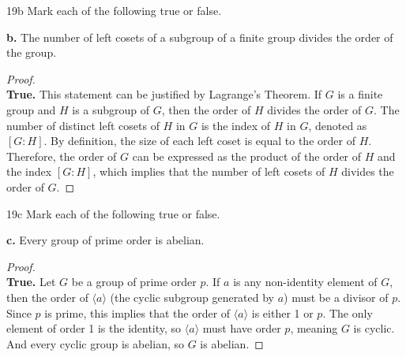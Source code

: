 \documentclass[12pt]{amsart}
\theoremstyle{definition}
\numberwithin{equation}{section}
\theoremstyle{plain}
\begin{document}
\begin{exercise}{19b} Mark each of the following true or false.

    \textbf{b.} The number of left cosets of a subgroup of a finite group divides the order of the group.
        
    \begin{proof} $ $ \\
\textbf{True.} This statement can be justified by Lagrange's Theorem. 
If \( G \) is a finite group and \( H \) is a subgroup of \( G \), then the order of \( H \) divides the order of \( G \). 
The number of distinct left cosets of \( H \) in \( G \) is the index of \( H \) in \( G \), denoted as \( [G : H] \). 
By definition, the size of each left coset is equal to the order of \( H \). 
Therefore, the order of \( G \) can be expressed as the product of the order of \( H \) and the index \( [G : H] \), which implies that the number of left cosets of \( H \) divides the order of \( G \).
        \end{proof}
\end{exercise}
\vspace*{20pt}
\begin{exercise}{19c} Mark each of the following true or false.

    \textbf{c.} Every group of prime order is abelian.

    \begin{proof} $ $ \\
        \textbf{True.} Let \( G \) be a group of prime order \( p \). 
        If \( a \) is any non-identity element of \( G \), then the order of \( \langle a \rangle \) (the cyclic subgroup generated by \( a \)) must be a divisor of \( p \). 
        Since \( p \) is prime, this implies that the order of \( \langle a \rangle \) is either 1 or \( p \). 
        The only element of order 1 is the identity, so \( \langle a \rangle \) must have order \( p \), meaning \( G \) is cyclic. 
        And every cyclic group is abelian, so \( G \) is abelian.
    \end{proof}
\end{exercise}
\vspace*{20pt}
\end{document}
